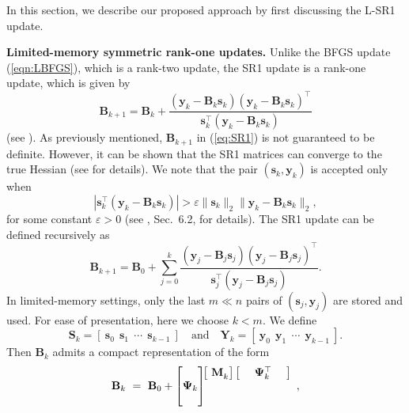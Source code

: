 In this section, we describe our proposed approach by first discussing the L-SR1 update.

\noindent \textbf{Limited-memory symmetric rank-one updates.} 
Unlike the BFGS update (\ref{eqn:LBFGS}), which is a rank-two update, the SR1 update is a rank-one update, which is  given by
\begin{equation}\label{eq:SR1}
	\mathbf{B}_{k+1} = \mathbf{B}_{k} + \frac{(\mathbf{y}_k - \mathbf{B}_k\mathbf{s}_k)
	(\mathbf{y}_k - \mathbf{B}_k\mathbf{s}_k)^{\top}}{\mathbf{s}_k^{\top}(\mathbf{y}_k - \mathbf{B}_k\mathbf{s}_k)}
\end{equation}
(see \citet{KhaBS93}).  As previously mentioned, $\mathbf{B}_{k+1}$ in (\ref{eq:SR1}) is not guaranteed to be definite.  However,
it can be shown that the SR1 matrices can converge to the true Hessian (see \citet{Conn1991} for details).
We note that the pair $(\mathbf{s}_k, \mathbf{y}_k)$ is accepted only when 
\begin{equation}\label{eq:acceptance1}
|\mathbf{s}_k^{\top}(\mathbf{y}_k - \mathbf{B}_k\mathbf{s}_k)| > \varepsilon \| \mathbf{s}_k \|_2 \| \mathbf{y}_k - \mathbf{B}_k \mathbf{s}_k \|_2,
\end{equation}
for some constant $\varepsilon > 0$ (see \citet{NoceWrig06}, Sec.\ 6.2, for details). The SR1 update can be defined recursively as
\begin{equation}\label{eq:SR1_B0}
	\mathbf{B}_{k+1} = \mathbf{B}_{0} + 
	\sum_{j = 0}^k \frac{(\mathbf{y}_j - \mathbf{B}_j\mathbf{s}_j)
	(\mathbf{y}_j - \mathbf{B}_j\mathbf{s}_j)^{\top}}{\mathbf{s}_j^{\top}(\mathbf{y}_j - \mathbf{B}_j\mathbf{s}_j)}.
\end{equation}
In limited-memory settings, only the last $m \ll n$ pairs of $(\mathbf{s}_j, \mathbf{y}_j)$ 
are stored and used.  
For ease of presentation, here we choose $k < m$.  We define
$$\mathbf{S}_{k} = [ \ \mathbf{s}_0 \ \  \mathbf{s}_1 \ \ \cdots  \ \ \mathbf{s}_{k-1} \ ] \quad \text{and} \quad 
\mathbf{Y}_{k} = [ \ \mathbf{y}_0 \ \ \mathbf{y}_1 \ \ \cdots \  \ \mathbf{y}_{k-1} \ ].
$$
Then 
$\mathbf{B}_{k}$ admits a compact representation of the form
\begin{equation}\label{eqn:compactSR1}
	\mathbf{B}_{k} \ = \ \mathbf{B}_0 + 
	\begin{bmatrix}
	\\
	\mathbf{\Psi}_{k}  \\
	\phantom{t}
	\end{bmatrix}
	\hspace{-.3cm}
	\begin{array}{c}
	\left  [ \  \mathbf{M}_{k}^{\phantom{h}}  \right ] \\
	\\
	\\
	\end{array}
	\hspace{-.3cm}
	\begin{array}{c}
	\left [  \ \quad \mathbf{\Psi}_{k}^{\top} \quad \ \right ] \\
	\\
	\\
	\end{array},
\end{equation}
